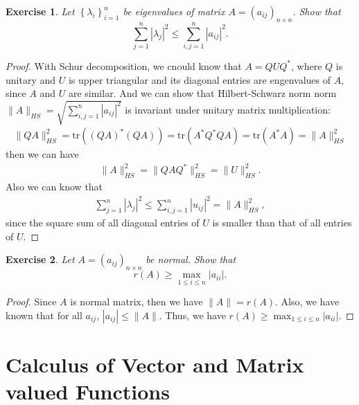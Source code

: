 \documentclass[11pt]{book}
\newtheorem{exercise}{Exercise}[section]
\theoremstyle{definition}
\numberwithin{equation}{subsection}
\begin{document}
\medskip

\begin{exercise}
Let $\left\{  \lambda_{i}\right\}  _{i=1}^{n}$ be eigenvalues of matrix
$A=\left(  a_{ij}\right)  _{n\times n}$. Show that%
$$
\sum_{j=1}^{n}\left\vert \lambda_{j}\right\vert ^{2}\leq\sum_{i,j=1}%
^{n}\left\vert a_{ij}\right\vert ^{2}.
$$
\end{exercise}
\begin{proof}
With Schur decomposition, we cnould know that $A = Q U Q^*$, where $Q$ is unitary and $U$ is upper triangular and its diagonal entries are engenvalues of $A$, since $A$ and $U$ are similar. And we can show that Hilbert-Schwarz norm norm $\|A\|_{HS} = \sqrt{\sum_{i,j=1}^{n} \left|a_{ij}\right|^2}$ is invariant under unitary matrix multiplication:
\begin{align*}
    \|QA\|_{HS}^2 = \text{tr} \left((QA)^* (QA)\right) = \text{tr} \left(A^* Q^* QA\right) = \text{tr} \left(A^* A\right) = \|A\|_{HS}^2
\end{align*}
then we can have 
\begin{align*}
    \|A\|_{HS}^2 = \|QAQ^*\|_{HS}^2 = \|U\|_{HS}^2.
\end{align*}
Also we can know that
\begin{align*}
    \sum_{j=1}^{n}\left| \lambda_{j}\right|^{2}\leq \sum_{i,j=1}^{n}\left| u_{ij}\right|^{2} = \|A\|_{HS}^2,
\end{align*}
since the square sum of all diagonal entries of $U$ is smaller than that of all entries of $U$.
\end{proof}

\medskip

\begin{exercise}
Let $A=\left(  a_{ij}\right)  _{n\times n}$ be normal. Show that%
$$
r\left(  A\right)  \geq\max_{1\leq i\leq n}\left\vert a_{ii}\right\vert .
$$
\end{exercise}
\begin{proof}
Since $A$ is normal matrix, then we have $\|A\| = r(A)$. Also, we have known that for all $a_{ij}$, $\left|a_{ij}\right|\leq \|A\|$. Thus, we have $r(A)\geq \max_{1\leq i\leq n}\left|a_{ii}\right|$.
\end{proof}



\chapter{Calculus of Vector and Matrix valued Functions}
\end{document}
